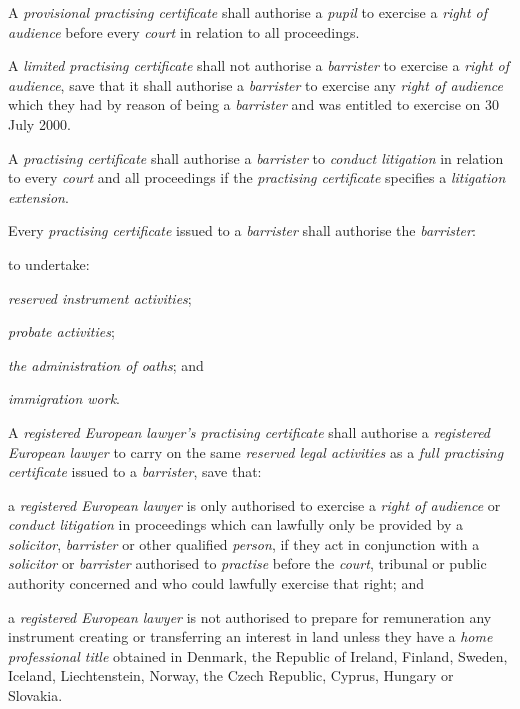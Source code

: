 
A \emph{provisional practising certificate} shall authorise a
\emph{pupil} to exercise a \emph{right of audience} before every
\emph{court} in relation to all proceedings.


A \emph{limited practising certificate} shall not authorise a
\emph{barrister} to exercise a \emph{right of audience}, save that it
shall authorise a \emph{barrister} to exercise any \emph{right of
audience} which they had by reason of being a \emph{barrister} and was
entitled to exercise on 30 July 2000.


A \emph{practising certificate} shall authorise a \emph{barrister} to
\emph{conduct litigation} in relation to every \emph{court} and all
proceedings if the \emph{practising certificate} specifies a
\emph{litigation extension}.


Every \emph{practising certificate} issued to a \emph{barrister} shall
authorise the \emph{barrister}:\nl\item to undertake:
\al
\item \emph{reserved instrument activities};

\item \emph{probate activities};

\item \emph{the administration of oaths}; and

\item \emph{immigration work}.\la
\ln
{}

A \emph{registered European lawyer's practising certificate} shall
authorise a \emph{registered European lawyer} to carry on the same
\emph{reserved legal activities} as a \emph{full practising certificate}
issued to a \emph{barrister}, save that:\nl\item a \emph{registered European lawyer} is only authorised to exercise a
\emph{right of audience} or \emph{conduct litigation} in proceedings
which can lawfully only be provided by a \emph{solicitor},
\emph{barrister} or other qualified \emph{person}, if they act in
conjunction with a \emph{solicitor} or \emph{barrister} authorised to
\emph{practise} before the \emph{court}, tribunal or public authority
concerned and who could lawfully exercise that right; and
\item a \emph{registered European lawyer} is not authorised to prepare for
remuneration any instrument creating or transferring an interest in land
unless they have a \emph{home professional title} obtained in Denmark,
the Republic of Ireland, Finland, Sweden, Iceland, Liechtenstein,
Norway, the Czech Republic, Cyprus, Hungary or Slovakia.
\ln
{}


